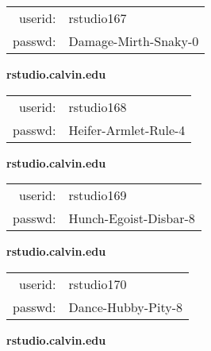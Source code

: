 \documentclass{article}\usepackage[]{graphicx}\usepackage[]{color}
\begin{document}
\begin{multicols}{3}
\begin{minipage}{.3\textwidth}
\begin{tabular}{rl}
userid: & rstudio167\\
passwd: & Damage-Mirth-Snaky-0

\vspace{5mm}

\end{tabular}\end{minipage}

\vspace{5mm}

\begin{minipage}{.3\textwidth}
\centerline{\textbf{rstudio.calvin.edu}}
\medskip
\begin{tabular}{rl}

userid: & rstudio168\\
passwd: & Heifer-Armlet-Rule-4

\vspace{5mm}

\end{tabular}\end{minipage}

\vspace{5mm}

\begin{minipage}{.3\textwidth}
\centerline{\textbf{rstudio.calvin.edu}}
\medskip
\begin{tabular}{rl}

userid: & rstudio169\\
passwd: & Hunch-Egoist-Disbar-8

\vspace{5mm}

\end{tabular}\end{minipage}

\vspace{5mm}

\begin{minipage}{.3\textwidth}
\centerline{\textbf{rstudio.calvin.edu}}
\medskip
\begin{tabular}{rl}

userid: & rstudio170\\
passwd: & Dance-Hubby-Pity-8

\vspace{5mm}

\end{tabular}\end{minipage}

\vspace{5mm}

\begin{minipage}{.3\textwidth}
\centerline{\textbf{rstudio.calvin.edu}}
\medskip
\begin{tabular}{rl}


\end{tabular}
\end{minipage}
\end{multicols}
\end{document}

